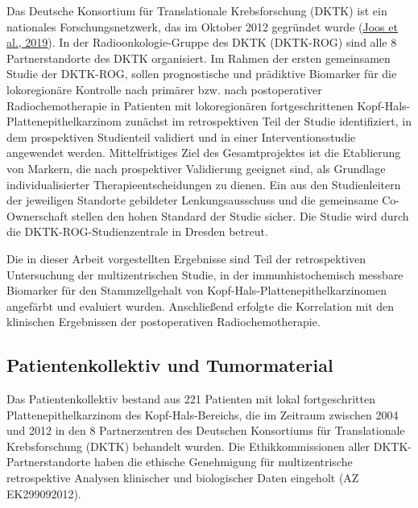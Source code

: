 Das Deutsche Konsortium für Translationale Krebsforschung (DKTK) ist ein nationales Forschungsnetzwerk, das im Oktober 2012 gegründet wurde (\href{about:blank\#_ENREF_41}{Joos et al., 2019}). In der Radioonkologie-Gruppe des DKTK (DKTK-ROG) sind alle 8 Partnerstandorte des DKTK organisiert. Im Rahmen der ersten gemeinsamen Studie der DKTK-ROG, sollen prognostische und prädiktive Biomarker für die lokoregionäre Kontrolle nach primärer bzw. nach postoperativer Radiochemotherapie in Patienten mit lokoregionären fortgeschrittenen Kopf-Hals-Plattenepithelkarzinom zunächst im retrospektiven Teil der Studie identifiziert, in dem prospektiven Studienteil validiert und in einer Interventionsstudie angewendet werden. Mittelfristiges Ziel des Gesamtprojektes ist die Etablierung von Markern, die nach prospektiver Validierung geeignet sind, als Grundlage individualisierter Therapieentscheidungen zu dienen. Ein aus den Studienleitern der jeweiligen Standorte gebildeter Lenkungsausschuss und die gemeinsame Co-Ownerschaft stellen den hohen Standard der Studie sicher. Die Studie wird durch die DKTK-ROG-Studienzentrale in Dresden betreut.

Die in dieser Arbeit vorgestellten Ergebnisse sind Teil der retrospektiven Untersuchung der multizentrischen Studie, in der immunhistochemisch messbare Biomarker für den Stammzellgehalt von Kopf-Hals-Plattenepithelkarzinomen angefärbt und evaluiert wurden. Anschließend erfolgte die Korrelation mit den klinischen Ergebnissen der postoperativen Radiochemotherapie.

\hypertarget{patientenkollektiv-und-tumormaterial}{%
\subsection{Patientenkollektiv und Tumormaterial}\label{patientenkollektiv-und-tumormaterial}}

Das Patientenkollektiv bestand aus 221 Patienten mit lokal fortgeschritten Plattenepithelkarzinom des Kopf-Hals-Bereichs, die im Zeitraum zwischen 2004 und 2012 in den 8 Partnerzentren des Deutschen Konsortiums für Translationale Krebsforschung (DKTK) behandelt wurden. Die Ethikkommissionen aller DKTK-Partnerstandorte haben die ethische Genehmigung für multizentrische retrospektive Analysen klinischer und biologischer Daten eingeholt (AZ EK299092012).


